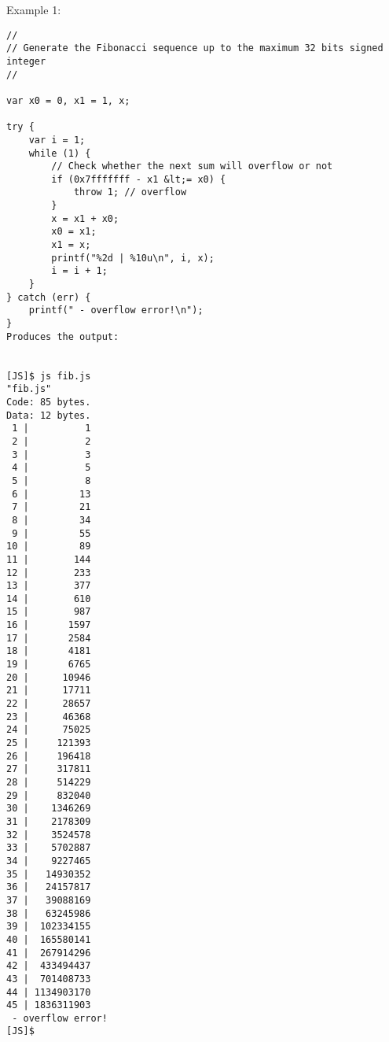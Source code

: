 \documentclass[11pt]{article} %
\begin{document}
Example 1:
\begin{lstlisting}[caption={Example 1},label={lst:verilog-if},language=C99,frame=single]
//
// Generate the Fibonacci sequence up to the maximum 32 bits signed integer
//

var x0 = 0, x1 = 1, x;

try {
    var i = 1;
    while (1) {
        // Check whether the next sum will overflow or not
        if (0x7fffffff - x1 &lt;= x0) {
            throw 1; // overflow
        }
        x = x1 + x0;
        x0 = x1;
        x1 = x;
        printf("%2d | %10u\n", i, x);
        i = i + 1;
    }
} catch (err) {
    printf(" - overflow error!\n");
}
Produces the output:


[JS]$ js fib.js
"fib.js"
Code: 85 bytes.
Data: 12 bytes.
 1 |          1
 2 |          2
 3 |          3
 4 |          5
 5 |          8
 6 |         13
 7 |         21
 8 |         34
 9 |         55
10 |         89
11 |        144
12 |        233
13 |        377
14 |        610
15 |        987
16 |       1597
17 |       2584
18 |       4181
19 |       6765
20 |      10946
21 |      17711
22 |      28657
23 |      46368
24 |      75025
25 |     121393
26 |     196418
27 |     317811
28 |     514229
29 |     832040
30 |    1346269
31 |    2178309
32 |    3524578
33 |    5702887
34 |    9227465
35 |   14930352
36 |   24157817
37 |   39088169
38 |   63245986
39 |  102334155
40 |  165580141
41 |  267914296
42 |  433494437
43 |  701408733
44 | 1134903170
45 | 1836311903
 - overflow error!
[JS]$
\end{lstlisting}
\end{document}
